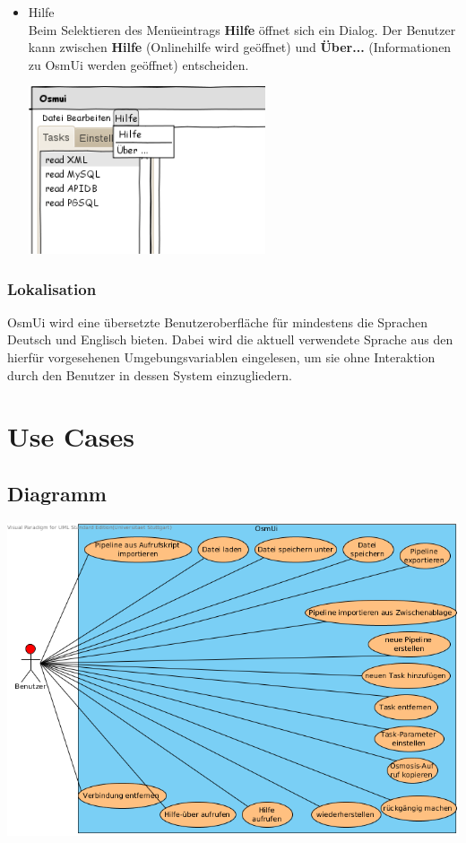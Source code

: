 \documentclass[a4paper,12pt]{scrartcl}
\begin{document}
\begin{itemize}
\begin{center}
\end{center}
\item Hilfe\\
Beim Selektieren des Menüeintrags \textbf{Hilfe} öffnet sich ein Dialog. Der Benutzer kann zwischen \textbf{Hilfe} (Onlinehilfe wird geöffnet) und \textbf{Über...} (Informationen zu OsmUi werden geöffnet) entscheiden.
\\
\begin{center}
\includegraphics[width=7cm]{ui_prototype/OsmUi_Hilfeklein.png}
\end{center}
\end{itemize}

\subsubsection{Lokalisation}
OsmUi wird eine übersetzte Benutzeroberfläche für mindestens die Sprachen Deutsch und Englisch bieten. Dabei wird die aktuell verwendete
Sprache aus den hierfür vorgesehenen Umgebungsvariablen eingelesen, um sie ohne Interaktion durch den Benutzer in dessen System einzugliedern.
\section{Use Cases}
\subsection{Diagramm}
\begin{center}
\includegraphics[width=15cm]{Use-Cases.png}
\end{center}
\newpage
\end{document}
